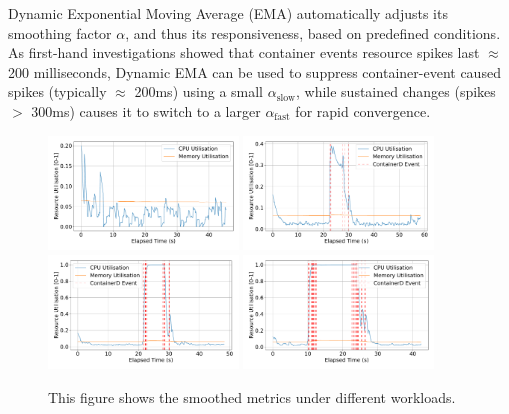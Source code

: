Dynamic Exponential Moving Average (EMA) automatically adjusts its smoothing
factor $\alpha$, and thus its responsiveness, based on predefined conditions.
As first-hand investigations showed that container events resource spikes last
$\approx$200 milliseconds, Dynamic EMA can be used to
suppress container-event caused spikes (typically $\approx$ 200ms) using a small
$\alpha_{\text{slow}}$, while sustained changes (spikes $>$ 300ms) causes it to
switch to a larger $\alpha_{\text{fast}}$ for rapid convergence.
\begin{figure}[H]
    \centering
    \includegraphics[width=0.45\textwidth]{images/filter-utilisation-baseline.pdf}
    \includegraphics[width=0.45\textwidth]{images/filter-utilisation-single.pdf} \\
    \includegraphics[width=0.45\textwidth]{images/filter-utilisation-smallbatch.pdf}
    \includegraphics[width=0.45\textwidth]{images/filter-utilisation-bigbatch.pdf}
    \caption{This figure shows the smoothed metrics under different workloads.}
    \label{fig:filtered-metrics-eval}
\end{figure}

